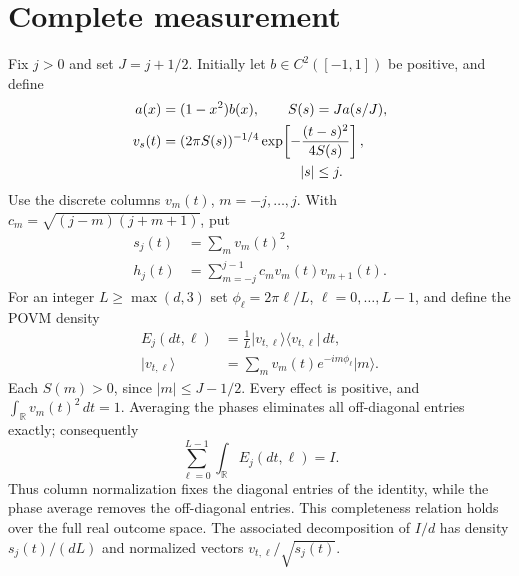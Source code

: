 \documentclass[aps,pra,reprint,superscriptaddress,longbibliography]{revtex4-2}
\theoremstyle{remark}
\newcommand{\R}{\mathbb R}
\newcommand{\ket}[1]{\lvert#1\rangle}
\newcommand{\bra}[1]{\langle#1\rvert}
\begin{document}
\section{Complete measurement}\label{sec:gaussian}
Fix $j>0$ and set $J=j+1/2$. Initially let
$b\in C^2([-1,1])$ be positive, and define
\begin{equation}
\begin{aligned}
a(x)&=(1-x^2)b(x),\qquad S(s)=Ja(s/J),\\
v_s(t)&=(2\pi S(s))^{-1/4}
 \exp\!\left[-\frac{(t-s)^2}{4S(s)}\right],\\
&\hspace{35mm}|s|\leq j.
\end{aligned}
\label{eq:columns}
\end{equation}
Use the discrete columns $v_m(t)$, $m=-j,\ldots,j$. With
$c_m=\sqrt{(j-m)(j+m+1)}$, put
\begin{equation}
\begin{aligned}
s_j(t)&=\sum_m v_m(t)^2,\\
h_j(t)&=\sum_{m=-j}^{j-1}c_mv_m(t)v_{m+1}(t).
\end{aligned}
\label{eq:sh}
\end{equation}
For an integer $L\geq\max(d,3)$ set
$\phi_\ell=2\pi\ell/L$, $\ell=0,\ldots,L-1$, and define the POVM density
\begin{equation}
\begin{aligned}
E_j(dt,\ell)&=\frac1L\ket{v_{t,\ell}}\bra{v_{t,\ell}}\,dt,\\
\ket{v_{t,\ell}}&=\sum_m v_m(t)e^{-im\phi_\ell}\ket m.
\end{aligned}
\label{eq:gaussian-povm}
\end{equation}
Each $S(m)>0$, since $|m|\leq J-1/2$. Every effect is positive,
and $\int_\R v_m(t)^2\,dt=1$. Averaging the phases eliminates all
off-diagonal entries exactly; consequently
\begin{equation}
 \sum_{\ell=0}^{L-1}\int_\R E_j(dt,\ell)=I.
 \label{eq:complete}
\end{equation}
Thus column normalization fixes the diagonal entries of the identity,
while the phase average removes the off-diagonal entries. This
completeness relation holds over the full real outcome space. The associated
decomposition of $I/d$ has density $s_j(t)/(dL)$ and normalized
vectors $v_{t,\ell}/\sqrt{s_j(t)}$.
\end{document}
